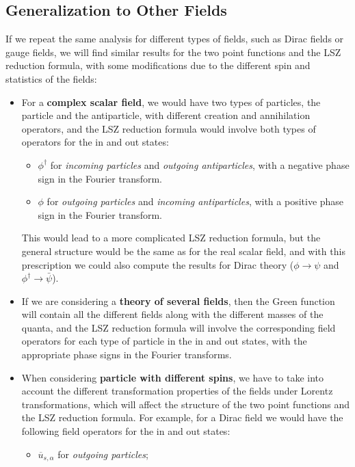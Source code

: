 \subsection{Generalization to Other Fields}

If we repeat the same analysis for different types of fields, such as Dirac fields or gauge fields, we will find similar results for the two point functions and the LSZ reduction formula, with some modifications due to the different spin and statistics of the fields:
\begin{itemize}
    \item For a \textbf{complex scalar field}, we would have two types of particles, the particle and the antiparticle, with different creation and annihilation operators, and the LSZ reduction formula would involve both types of operators for the in and out states:
          \begin{itemize}
              \item \(\phi^{\dagger}\) for \textit{incoming particles} and \textit{outgoing antiparticles}, with a negative phase sign in the Fourier transform.
              \item \(\phi\) for \textit{outgoing particles} and \textit{incoming antiparticles}, with a positive phase sign in the Fourier transform.
          \end{itemize}
          This would lead to a more complicated LSZ reduction formula, but the general structure would be the same as for the real scalar field, and with this prescription we could also compute  the results for Dirac theory (\(\phi \to \psi\) and \(\phi^{\dagger} \to \bar{\psi}\)).
    \item If we are considering a \textbf{theory of several fields}, then the Green function will contain all the different fields along with the different masses of the quanta, and the LSZ reduction formula will involve the corresponding field operators for each type of particle in the in and out states, with the appropriate phase signs in the Fourier transforms.
    \item When considering \textbf{particle with different spins}, we have to take into account the different transformation properties of the fields under Lorentz transformations, which will affect the structure of the two point functions and the LSZ reduction formula. For example, for a Dirac field we would have the following field operators for the in and out states:
          \begin{itemize}
              \item \(\overline{u}_{s,\alpha}\) for \textit{outgoing particles};

\end{itemize}
\end{itemize}
